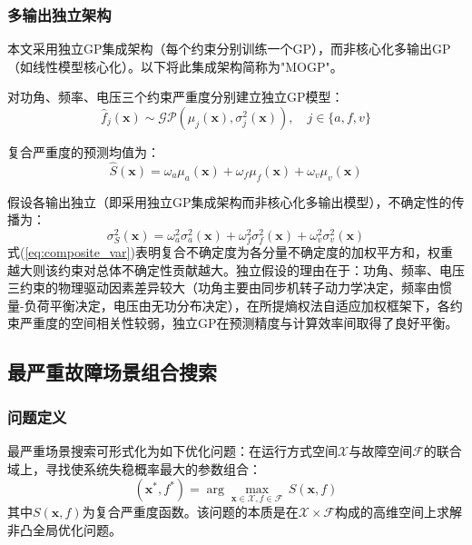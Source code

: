 \documentclass[a4paper,11pt]{ctexart}
\newcommand{\bx}{\mathbf{x}}
\begin{document}
\subsubsection{多输出独立架构}

本文采用独立GP集成架构（每个约束分别训练一个GP），而非核心化多输出GP（如线性模型核心化）。以下将此集成架构简称为"MOGP"。

对功角、频率、电压三个约束严重度分别建立独立GP模型：
\begin{equation}
    \hat{f}_j(\bx) \sim \mathcal{GP}(\mu_j(\bx), \sigma_j^2(\bx)), \quad j \in \{a, f, v\}
    \label{eq:mogp}
\end{equation}

复合严重度的预测均值为：
\begin{equation}
    \hat{S}(\bx) = \omega_a \mu_a(\bx) + \omega_f \mu_f(\bx) + \omega_v \mu_v(\bx)
    \label{eq:composite_mean}
\end{equation}

假设各输出独立（即采用独立GP集成架构而非核心化多输出模型），不确定性的传播为：
\begin{equation}
    \sigma_S^2(\bx) = \omega_a^2 \sigma_a^2(\bx) + \omega_f^2 \sigma_f^2(\bx) + \omega_v^2 \sigma_v^2(\bx)
    \label{eq:composite_var}
\end{equation}
式(\ref{eq:composite_var})表明复合不确定度为各分量不确定度的加权平方和，权重越大则该约束对总体不确定性贡献越大。独立假设的理由在于：功角、频率、电压三约束的物理驱动因素差异较大（功角主要由同步机转子动力学决定，频率由惯量-负荷平衡决定，电压由无功分布决定），在所提熵权法自适应加权框架下，各约束严重度的空间相关性较弱，独立GP在预测精度与计算效率间取得了良好平衡。

\subsection{最严重故障场景组合搜索}
\label{subsec:worst_case}

\subsubsection{问题定义}

最严重场景搜索可形式化为如下优化问题：在运行方式空间$\mathcal{X}$与故障空间$\mathcal{F}$的联合域上，寻找使系统失稳概率最大的参数组合：
\begin{equation}
    (\bx^*, f^*) = \arg\max_{\bx \in \mathcal{X}, f \in \mathcal{F}} \, S(\bx, f)
    \label{eq:worst_case}
\end{equation}
其中$S(\bx, f)$为复合严重度函数。该问题的本质是在$\mathcal{X} \times \mathcal{F}$构成的高维空间上求解非凸全局优化问题。
\end{document}
